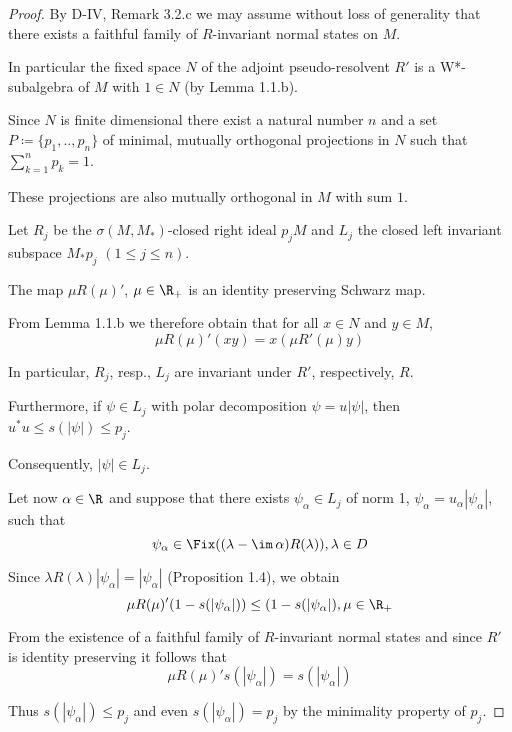 \begin{proof}
By D-IV, Remark 3.2.c we may assume without loss of generality that there exists a faithful family of $R$-invariant normal states on $M$.

In particular the fixed space $N$ of the adjoint pseudo-resolvent $R'$ is a W*-subalgebra of $M$ with $1 \in N$ (by Lemma 1.1.b).

Since $N$ is finite dimensional there exist a natural number $n$ and a set $P \coloneqq \{p_{1}, .., p_{n}\}$ of minimal, mutually orthogonal projections in $N$ such that $\sum_{k=1}^{n} p_{k} = 1$.

These projections are also mutually orthogonal in $M$ with sum $1$.

Let $R_{j}$ be the $\sigma(M,M_{*})$-closed right ideal $p_{j}M$ and $L_{j}$ the closed left invariant subspace $M_{*}p_{j}$ $(1 \leq j \leq n)$.

The map $\mu R(\mu)'$, $\mu \in \R_{+}$ is an identity preserving Schwarz map.

From Lemma 1.1.b we therefore obtain that for all $x \in N$ and $y \in M$,
\[
\mu R(\mu)'(xy) = x(\mu R'(\mu)y)
\]

In particular, $R_{j}$, resp., $L_{j}$ are invariant under $R'$, respectively, $R$.

Furthermore, if $\psi \in L_{j}$ with polar decomposition $\psi = u|\psi|$, then $u^{*}u \leq s(|\psi|) \leq p_{j}$.

Consequently, $|\psi| \in L_{j}$.

Let now $\alpha \in \R$ and suppose that there exists $\psi_{\alpha} \in L_{j}$ of norm 1, $\psi_{\alpha} = u_{\alpha}|\psi_{\alpha}|$, such that
\[
\psi_{\alpha} \in \Fix((\lambda - \im\,\alpha)R(\lambda)) , \lambda \in D
\]

Since $\lambda R(\lambda)|\psi_{\alpha}| = |\psi_{\alpha}|$ (Proposition 1.4), we obtain
\[
\mu R(\mu)'(1-s(|\psi_{\alpha}|)) \leq (1-s(|\psi_{\alpha}|) , \mu \in \R_{+}
\]

From the existence of a faithful family of $R$-invariant normal states and since $R'$ is identity preserving it follows that
\[
\mu R(\mu)'s(|\psi_{\alpha}|) = s(|\psi_{\alpha}|)
\]







Thus $s(|\psi_{\alpha}|) \leq p_{j}$ and even $s(|\psi_{\alpha}|) = p_{j}$ by the minimality property of $p_{j}$.


\end{proof}
